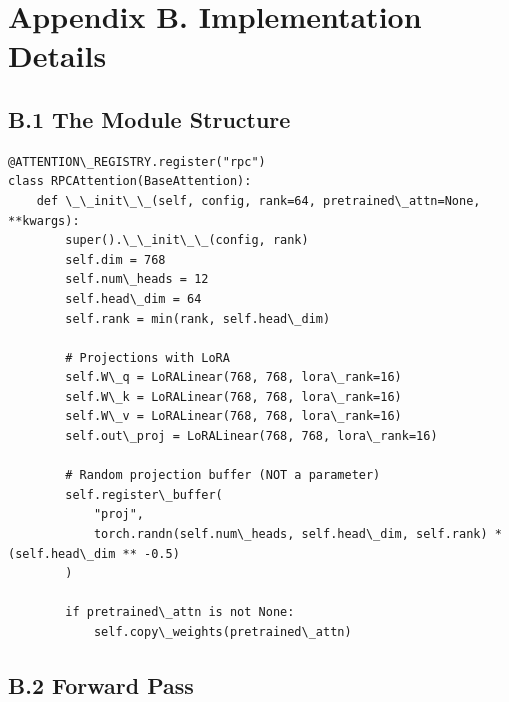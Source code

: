 
\section{Appendix B. Implementation Details}

\subsection{B.1 The Module Structure}

\begin{lstlisting}
@ATTENTION\_REGISTRY.register("rpc")
class RPCAttention(BaseAttention):
    def \_\_init\_\_(self, config, rank=64, pretrained\_attn=None, **kwargs):
        super().\_\_init\_\_(config, rank)
        self.dim = 768
        self.num\_heads = 12
        self.head\_dim = 64
        self.rank = min(rank, self.head\_dim)
        
        # Projections with LoRA
        self.W\_q = LoRALinear(768, 768, lora\_rank=16)
        self.W\_k = LoRALinear(768, 768, lora\_rank=16)
        self.W\_v = LoRALinear(768, 768, lora\_rank=16)
        self.out\_proj = LoRALinear(768, 768, lora\_rank=16)
        
        # Random projection buffer (NOT a parameter)
        self.register\_buffer(
            "proj",
            torch.randn(self.num\_heads, self.head\_dim, self.rank) * (self.head\_dim ** -0.5)
        )
        
        if pretrained\_attn is not None:
            self.copy\_weights(pretrained\_attn)
\end{lstlisting}

\subsection{B.2 Forward Pass}

